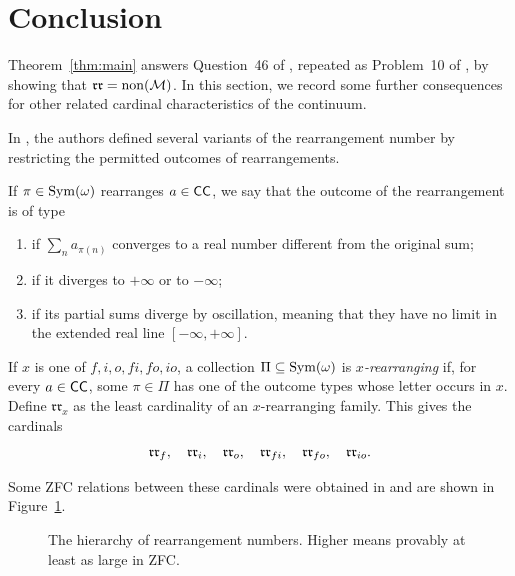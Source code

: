 \section{Conclusion}\label{sec:conclusion}

Theorem~\ref{thm:main} answers Question~46 of \cite{BBBHHL}, repeated
as Problem~10 of \cite{BrechBrendleTelles}, by showing that $\mathfrak{rr}=\operatorname{non}(\mathcal M)$.
In this section, we record some further
consequences for other related cardinal characteristics of the continuum.

In \cite{BBBHHL}, the authors defined several variants of the rearrangement number
by restricting the permitted outcomes of rearrangements.

\begin{definition}\label{def:rr-variants}
If $\pi\in\operatorname{Sym}(\omega)$
rearranges $a\in\mathsf{CC}$, we say that the outcome of the rearrangement is of type
\begin{enumerate}
\item[$f$] if $\sum_n a_{\pi(n)}$ converges to a real number different
      from the original sum;
\item[$i$] if it diverges to $+\infty$ or to $-\infty$;
\item[$o$] if its partial sums diverge by oscillation, meaning that
      they have no limit in the extended real line
      $[-\infty,+\infty]$.
\end{enumerate}
If $x$ is one of $f,i,o,fi,fo,io$, a collection
$\Pi\subseteq\operatorname{Sym}(\omega)$ is \emph{$x$-rearranging} if, for every
$a\in\mathsf{CC}$, some $\pi\in\Pi$ has one of the outcome types whose letter
occurs in $x$. Define $\mathfrak{rr}_x$ as the least cardinality of an
$x$-rearranging family. This gives the cardinals
\[
 \mathfrak{rr}_{f},\quad\mathfrak{rr}_{i},\quad\mathfrak{rr}_{o},\quad
 \mathfrak{rr}_{fi},\quad\mathfrak{rr}_{fo},\quad\mathfrak{rr}_{io}.
\]
\end{definition}

Some ZFC relations between these cardinals were obtained in \cite{BBBHHL} and are shown in Figure~\ref{fig:rr-variants}.

\begin{figure}[ht]
\begin{center}
\end{center}
\caption{The hierarchy of rearrangement numbers.
Higher means provably at least as large in ZFC.}
\label{fig:rr-variants}
\end{figure}

